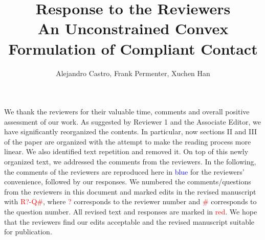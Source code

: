 \documentclass[12pt]{article}
\begin{document}
\author{Alejandro Castro, Frank Permenter, Xuchen Han}
\title{Response to the Reviewers \\
  \large An Unconstrained Convex Formulation of Compliant Contact}
\maketitle

We thank the reviewers for their valuable time, comments and overall positive
assessment of our work. As suggested by Reviewer 1 and the Associate Editor, we have
significantly reorganized the contents. In particular, now sections II
and III of the paper are organized with the attempt to make the reading process
more linear. We also identified text repetition and removed it. On top of this
newly organized text, we addressed the comments from the reviewers. In the
following, the comments of the reviewers are reproduced here in
\textcolor{blue}{blue} for the reviewers' convenience, followed by our
responses. We numbered the comments/questions from the reviewers in this
document and marked edits in the revised manuscript with
\textcolor{red}{R?-Q\#}, where \textcolor{red}{?} corresponds to the reviewer
number and \textcolor{red}{\#} corresponds to the question number. All revised
text and responses are marked in \textcolor{red}{red}. We hope that the
reviewers find our edits acceptable and the revised manuscript suitable for
publication.








\end{document}
